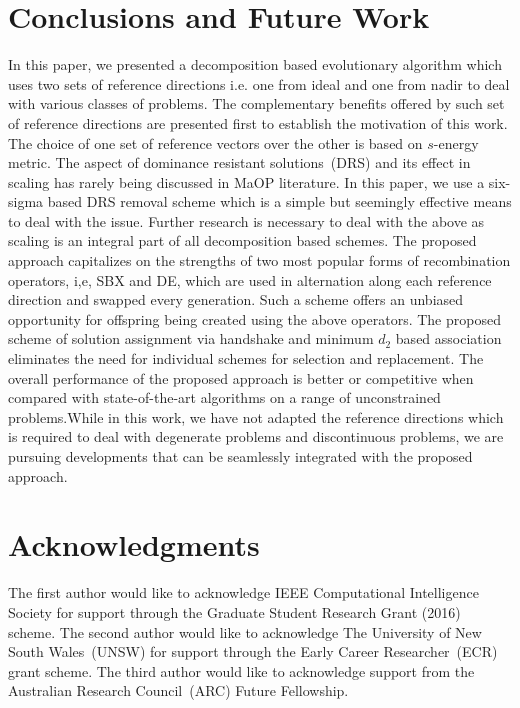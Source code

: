 \documentclass{sig-alternate}
\begin{document}
\section{Conclusions and Future Work}
\label{sec:conc}
In this paper, we presented a decomposition based evolutionary algorithm which uses two sets of reference directions i.e. one from ideal and one from nadir to deal with various classes of problems. The complementary benefits offered by such set of reference directions are presented first to establish the motivation of this work. The choice of one set of reference vectors over the other is based on $s$-energy metric. The aspect of dominance resistant solutions~(DRS) and its effect in scaling has rarely being discussed in MaOP literature. In this paper, we use a six-sigma based DRS removal scheme which is a simple but seemingly effective means to deal with the issue. Further research is necessary to deal with the above as scaling is an integral part of all decomposition based schemes. 
The proposed approach capitalizes on the strengths of two most popular forms of recombination operators, i,e, SBX and DE, which are used in alternation along each reference direction and swapped every generation. Such a scheme offers an unbiased opportunity for offspring being created using the above operators. The proposed scheme of solution assignment via handshake and minimum $d_2$ based association eliminates the need for individual schemes for selection and replacement. The overall performance of the proposed approach is better or competitive when compared with state-of-the-art algorithms on a range of unconstrained problems.While in this work, we have not adapted the reference directions which is required to deal with degenerate problems and discontinuous problems, we are pursuing developments that can be seamlessly integrated with the proposed approach.

\section*{Acknowledgments}

The first author would like to acknowledge IEEE Computational Intelligence Society for support through the Graduate Student Research Grant (2016) scheme. The second author would like to acknowledge The University of New South Wales~(UNSW) for support through the Early Career Researcher~(ECR) grant scheme. The third author would like to acknowledge support from the Australian Research Council~(ARC) Future Fellowship. 


\small{}
\balance
\end{document}
